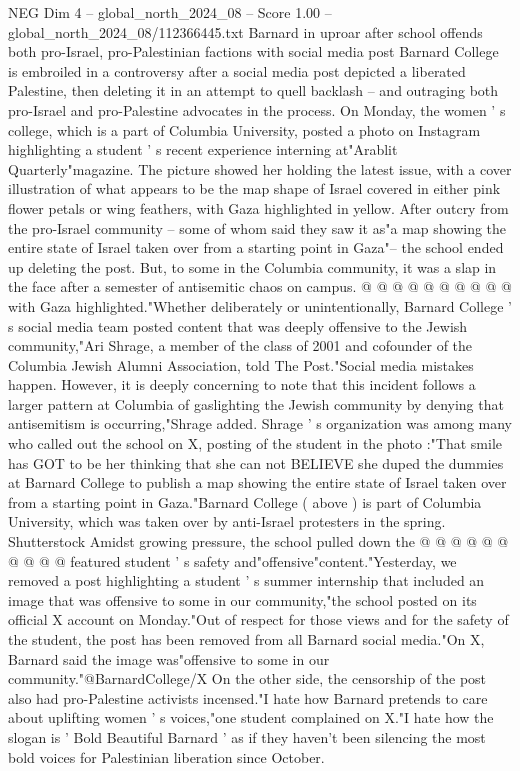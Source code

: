 \begin{textsample}{NEG Dim 4 – global\_north\_2024\_08 – Score 1.00 – global\_north\_2024\_08/112366445.txt}  \label{ex:f4_neg_307}
Barnard in uproar after school offends both pro-Israel, pro-Palestinian factions with social media post Barnard College is embroiled in a controversy after a social media post depicted a liberated Palestine, then deleting it in an attempt to quell backlash -- and outraging both pro-Israel and pro-Palestine advocates in the process.
On Monday, the women ' s college, which is a part of Columbia University, posted a photo on Instagram highlighting a student ' s recent experience interning at"Arablit Quarterly"magazine.
The picture showed her holding the latest issue, with a cover illustration of what appears to be the map shape of Israel covered in either pink flower petals or wing feathers, with Gaza highlighted in yellow.
After outcry from the pro-Israel community -- some of whom said they saw it as"a map showing the entire state of Israel taken over from a starting point in Gaza"-- the school ended up deleting the post.
But, to some in the Columbia community, it was a slap in the face after a semester of antisemitic chaos on campus. @ @ @ @ @ @ @ @ @ @ with Gaza highlighted."Whether deliberately or unintentionally, Barnard College ' s social media team posted content that was deeply offensive to the Jewish community,"Ari Shrage, a member of the class of 2001 and cofounder of the Columbia Jewish Alumni Association, told The Post."Social media mistakes happen.
However, it is deeply concerning to note that this incident follows a larger pattern at Columbia of gaslighting the Jewish community by denying that antisemitism is occurring,"Shrage added.
Shrage ' s organization was among many who called out the school on X, posting of the student in the photo :"That smile has GOT to be her thinking that she can not BELIEVE she duped the dummies at Barnard College to publish a map showing the entire state of Israel taken over from a starting point in Gaza."Barnard College ( above ) is part of Columbia University, which was taken over by anti-Israel protesters in the spring.
Shutterstock Amidst growing pressure, the school pulled down the @ @ @ @ @ @ @ @ @ @ featured student ' s safety and"offensive"content."Yesterday, we removed a post highlighting a student ' s summer internship that included an image that was offensive to some in our community,"the school posted on its official X account on Monday."Out of respect for those views and for the safety of the student, the post has been removed from all Barnard social media."On X, Barnard said the image was"offensive to some in our community."@BarnardCollege/X On the other side, the censorship of the post also had pro-Palestine activists incensed."I hate how Barnard pretends to care about uplifting women ' s voices,"one student complained on X."I hate how the slogan is ' Bold Beautiful Barnard ' as if they haven't been silencing the most bold voices for Palestinian liberation since October.

\end{textsample}

